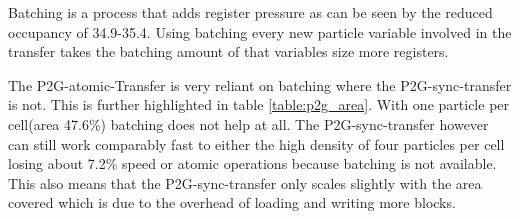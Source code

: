\documentclass[m,times]{cgMA}
\begin{document}
Batching is a process that adds register pressure as can be seen by the reduced occupancy of 34.9-35.4. Using batching every new particle variable involved in the transfer takes the batching amount of that variables size more registers.

The P2G-atomic-Transfer is very reliant on batching where the P2G-sync-transfer is not. This is further highlighted in table \ref{table:p2g_area}. With one particle per cell(area 47.6\%) batching does not help at all. The P2G-sync-transfer however can still work comparably fast to either the high density of four particles per cell losing about 7.2\% speed or atomic operations because batching is not available. This also means that the P2G-sync-transfer only scales slightly with the area covered which is due to the overhead of loading and writing more blocks.
\end{document}
